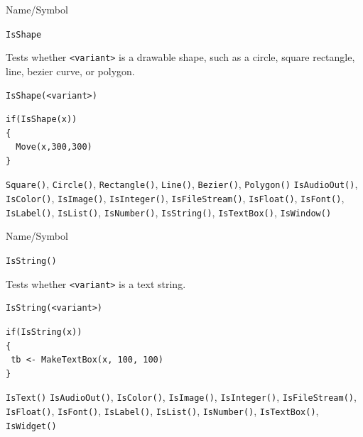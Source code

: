 \begin{desc}{Name/Symbol}
\item[Name/Symbol]	\verb+IsShape+

\item[Description]	Tests whether \verb+<variant>+ is a drawable
  shape, such as a circle, square rectangle, line, bezier curve, or
  polygon.


\item[Usage]		
\begin{verbatim}
IsShape(<variant>)
\end{verbatim}

\item[Example]	
\begin{verbatim}
if(IsShape(x))
{
  Move(x,300,300)
}
\end{verbatim}

\item[See Also]	\verb+Square()+, \verb+Circle()+,
  \verb+Rectangle()+, \verb+Line()+, \verb+Bezier()+, \verb+Polygon()+ 
 \verb+IsAudioOut()+, \verb+IsColor()+,
  \verb+IsImage()+, \verb+IsInteger()+, \verb+IsFileStream()+,
  \verb+IsFloat()+, \verb+IsFont()+, \verb+IsLabel()+,
  \verb+IsList()+, \verb+IsNumber()+, \verb+IsString()+,
  \verb+IsTextBox()+, \verb+IsWindow()+
\end{desc}

\begin{desc}{Name/Symbol}
\item[Name/Symbol]	\verb+IsString()+

\item[Description]	Tests whether \verb+<variant>+ is a text string.

\item[Usage]		
\begin{verbatim}
IsString(<variant>)
\end{verbatim}

\item[Example]	
\begin{verbatim}
if(IsString(x))
{
 tb <- MakeTextBox(x, 100, 100)
}
\end{verbatim}

\item[See Also] \verb+IsText()+	\verb+IsAudioOut()+, \verb+IsColor()+, \verb+IsImage()+, \verb+IsInteger()+, 
		\verb+IsFileStream()+, \verb+IsFloat()+, \verb+IsFont()+, \verb+IsLabel()+,
		\verb+IsList()+, \verb+IsNumber()+, \verb+IsTextBox()+, \verb+IsWidget()+
\end{desc}

